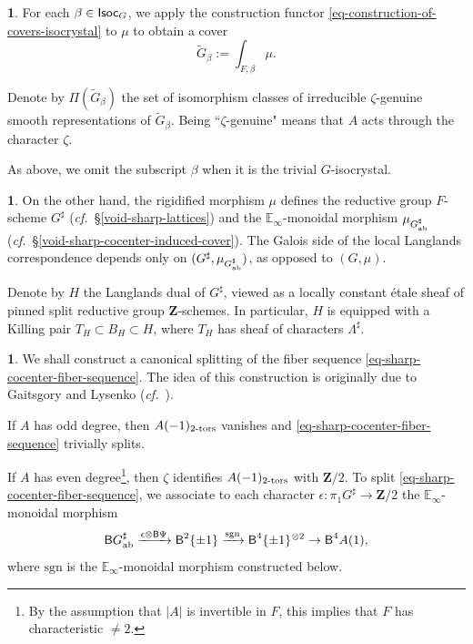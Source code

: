 \documentclass[10pt,english,reqno]{amsart}
\newcommand{\integers}{\mathbf Z}
\newcommand{\Isoc}{\textnormal{\textsf{Isoc}}}
\newcommand{\deloop}{\textnormal{\textsf{B}}}
\newcommand{\abelian}{\textnormal{ab}}
\newcommand{\tors}{\textnormal{-tors}}
\newcommand{\sgn}{\mathrm{sgn}}
\theoremstyle{definition}
\numberwithin{equation}{section}
\newtheorem{untitledsubsubsection}[subsubsection]{}
\newenvironment{void}
{\begin{untitledsubsubsection}}
{\end{untitledsubsubsection}}
\begin{document}

\begin{void}
\label{void-local-langlands-correspondence-cover-construction}
For each $\beta \in \Isoc_G$, we apply the construction functor \eqref{eq-construction-of-covers-isocrystal} to $\mu$ to obtain a cover
$$
\widetilde G_{\beta} := \int_{F, \beta} \mu.
$$

Denote by $\Pi(\widetilde G_{\beta})$ the set of isomorphism classes of irreducible $\zeta$-genuine smooth representations of $\widetilde G_{\beta}$. Being ``$\zeta$-genuine" means that $A$ acts through the character $\zeta$.

As above, we omit the subscript $\beta$ when it is the trivial $G$-isocrystal.
\end{void}


\begin{void}
\label{void-metaplectic-dual-data}
On the other hand, the rigidified morphism $\mu$ defines the reductive group $F$-scheme $G^{\sharp}$ (\emph{cf.}~\S\ref{void-sharp-lattices}) and the $\mathbb E_{\infty}$-monoidal morphism $\mu_{G_{\abelian}^{\sharp}}$ (\emph{cf.}~\S\ref{void-sharp-cocenter-induced-cover}). The Galois side of the local Langlands correspondence depends only on $(G^{\sharp}, \mu_{G_{\abelian}^{\sharp}})$, as opposed to $(G, \mu)$.

Denote by $H$ the Langlands dual of $G^{\sharp}$, viewed as a locally constant \'etale sheaf of pinned split reductive group $\integers$-schemes. In particular, $H$ is equipped with a Killing pair $T_H\subset B_H \subset H$, where $T_H$ has sheaf of characters $\Lambda^{\sharp}$.
\end{void}


\begin{void}
\label{void-sharp-cocenter-fiber-sequence-splitting}
We shall construct a canonical splitting of the fiber sequence \eqref{eq-sharp-cocenter-fiber-sequence}. The idea of this construction is originally due to Gaitsgory and Lysenko (\emph{cf.}~\cite[\S4.8]{MR3769731}).

If $A$ has odd degree, then $A(-1)_{2\tors}$ vanishes and \eqref{eq-sharp-cocenter-fiber-sequence} trivially splits.

If $A$ has even degree\footnote{By the assumption that $|A|$ is invertible in $F$, this implies that $F$ has characteristic $\neq 2$.}, then $\zeta$ identifies $A(-1)_{2\tors}$ with $\integers/2$. To split \eqref{eq-sharp-cocenter-fiber-sequence}, we associate to each character $\epsilon : \pi_1G^{\sharp} \rightarrow \integers/2$ the $\mathbb E_{\infty}$-monoidal morphism
\begin{equation}
\label{eq-sign-cover-composition-with-character}
\deloop G^{\sharp}_{\abelian} \xrightarrow{\epsilon \otimes \deloop\Psi} \deloop^2\{\pm 1\} \xrightarrow{\sgn} \deloop^4\{\pm 1\}^{\otimes 2} \rightarrow \deloop^4A(1),
\end{equation}
where $\sgn$ is the $\mathbb E_{\infty}$-monoidal morphism constructed below.
\end{void}
\end{document}
